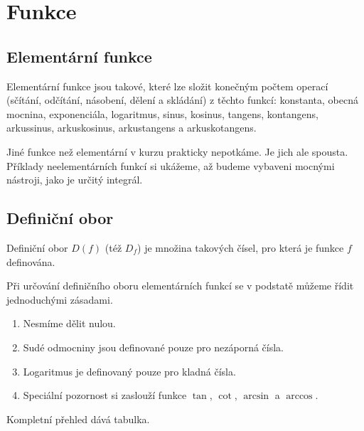 \section{Funkce}

\subsection{Elementární funkce}

Elementární funkce jsou takové, které lze složit konečným počtem operací (sčítání, odčítání, násobení, dělení a skládání) z těchto funkcí: konstanta, obecná mocnina, exponenciála, logaritmus, sinus, kosinus, tangens, kontangens, arkussinus, arkuskosinus, arkustangens a arkuskotangens. 

Jiné funkce než elementární v kurzu prakticky nepotkáme. Je jich ale spousta. Příklady neelementárních funkcí si ukážeme, až budeme vybaveni mocnými nástroji, jako je určitý integrál.

\subsection{Definiční obor}

Definiční obor $D(f)$ (též $D_f$) je množina takových čísel, pro která je funkce $f$ definována.

Při určování definičního oboru elementárních funkcí se v podstatě můžeme řídit jednoduchými zásadami.

\begin{enumerate}
    \item Nesmíme dělit nulou.
    \item Sudé odmocniny jsou definované pouze pro nezáporná čísla.
    \item Logaritmus je definovaný pouze pro kladná čísla.
    \item Speciální pozornost si zaslouží funkce $\tan$, $\cot$, $\arcsin$ a $\arccos$.
\end{enumerate}

Kompletní přehled dává tabulka.

